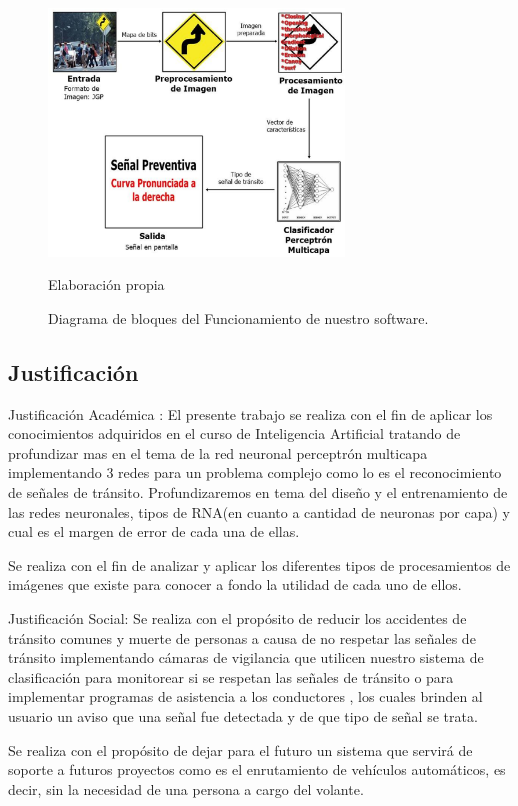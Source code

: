 \documentclass[a4paper, 12pt]{article}
\begin{document}
\begin{figure}[ht]
\begin{center}
\includegraphics[width=0.7\textwidth]{funcionamiento}
\end{center}
\begin{center}
\vskip -0.5cm
\caption{\small{Diagrama de bloques del Funcionamiento de nuestro software.}}
{\small{Elaboración propia}}
\end{center}
\end{figure}

\newpage
\subsection{Justificación}
Justificación Académica :
\vskip 0.2cm
El presente trabajo se realiza con el fin de aplicar los conocimientos adquiridos en el curso de Inteligencia Artificial tratando de profundizar mas en el tema de la red neuronal perceptrón multicapa implementando 3 redes para un problema complejo como lo es el reconocimiento de señales de tránsito. Profundizaremos en tema del diseño y el entrenamiento de las redes neuronales, tipos de RNA(en cuanto a cantidad de neuronas por capa) y cual es el margen de error de cada una de ellas.\par
\vskip 0.2cm
Se realiza con el fin de analizar y aplicar los diferentes tipos de procesamientos de imágenes que existe para conocer a fondo la utilidad de cada uno de ellos.\par
\vskip 0.4cm
Justificación Social: 
\vskip 0.2cm
Se realiza con el propósito de reducir los accidentes de tránsito comunes y muerte de personas a causa de no respetar las señales de tránsito implementando cámaras de vigilancia que utilicen nuestro sistema de clasificación para monitorear si se respetan las señales de tránsito o para implementar programas de asistencia a los conductores , los cuales brinden al usuario un aviso que una señal fue detectada y de que tipo de señal se trata.\par
\vskip 0.2cm
Se realiza con el propósito de dejar para el futuro un sistema que servirá de soporte a futuros proyectos como es el enrutamiento de vehículos automáticos, es decir, sin la necesidad de una persona a cargo del volante.\par
\vskip 0.4cm
\end{document}
